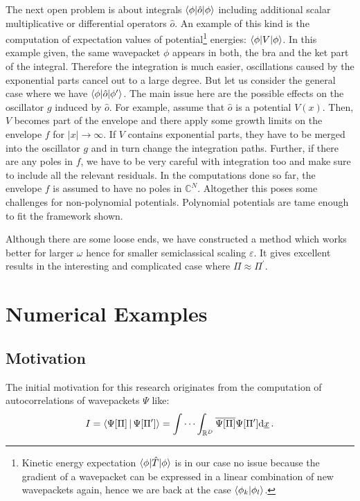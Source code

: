 \documentclass[a4paper,10pt]{article}
\begin{document}
The next open problem is about integrals $\braket{\phi|\hat{o}|\phi}$ including
additional scalar multiplicative or differential operators $\hat{o}$. An example
of this kind is the computation of expectation values of potential\footnote{Kinetic energy
expectation $\braket{\phi|\hat{T}|\phi}$ is in our case no issue because the
gradient of a wavepacket can be expressed in a linear combination of new wavepackets
again, hence we are back at the case $\braket{\phi_k|\phi_l}$.}
energies: $\braket{\phi|V|\phi}$.
In this example given, the same wavepacket $\phi$ appears in both, the bra and the
ket part of the integral. Therefore the integration is much easier, oscillations
caused by the exponential parts cancel out to a large degree. But let us consider
the general case where we have $\braket{\phi|\hat{o}|\phi^\prime}$. The main issue
here are the possible effects on the oscillator $g$ induced by $\hat{o}$. For example,
assume that $\hat{o}$ is a potential $V(x)$. Then, $V$ becomes part of the envelope
and there apply some growth limits on the envelope $f$ for $|x| \rightarrow \infty$.
If $V$ contains exponential parts, they have to be merged into the oscillator $g$ and
in turn change the integration paths. Further, if there are any poles
in $f$, we have to be very careful with integration too and make sure to include all
the relevant residuals. In the computations done so far, the envelope $f$ is assumed
to have no poles in $\mathbb{C}^{N}$. Altogether this poses some challenges for
non-polynomial potentials. Polynomial potentials are tame enough to
fit the framework shown.

Although there are some loose ends, we have constructed a method which works better
for larger $\omega$ hence for smaller semiclassical scaling $\varepsilon$.
It gives excellent results in the interesting and complicated case where
$\Pi \approx \Pi^{\prime}$.


\section{Numerical Examples}

\subsection{Motivation}


The initial motivation for this research originates from the computation of autocorrelations
of wavepackets $\Psi$ like:
\begin{equation} \label{eq:compute_ac_wavepackets}
  I = \Braket{\Psi[\Pi] | \Psi[\Pi^{\prime}]}
    = \idotsint_{\mathbb{R}^{D}} \overline{\Psi[\Pi]} \Psi[\Pi^{\prime}] \mathrm{d}\underline{x} \,.
\end{equation}
\end{document}

